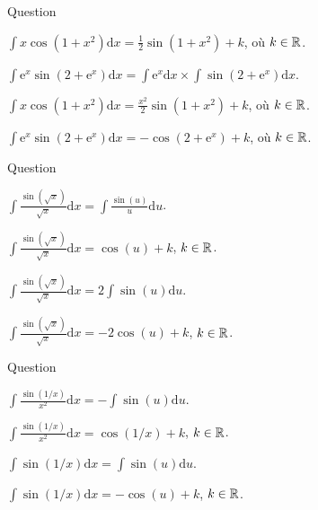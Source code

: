 \begin{multi}[multiple,feedback=
{Avec \(u=1+x^2\), on a : \(\mathrm{d}u=2x\mathrm{d}x\) et 
\[\int x\cos(1+x^2)\mathrm{d}x=\frac{1}{2}\int \cos (u)\mathrm{d}u=\frac{1}{2}\times \sin (u)+k=\frac{1}{2}\sin(1+x^2)+k,\; k\in \Rr.\]
De même, avec \(u=2+\mathrm{e}^x\), on a : \(\mathrm{d}u=\mathrm{e}^x\mathrm{d}x\) et 
\[\int \mathrm{e}^x\sin\left(2+\mathrm{e}^x\right)\mathrm{d}x=\int \sin (u)\mathrm{d}u=-\cos (u)+k=-\cos\left(2+\mathrm{e}^x\right)+k,\; k\in \Rr.\]
}]{Question}
    \item* \(\displaystyle \int x\cos(1+x^2)\mathrm{d}x=\frac{1}{2}\sin(1+x^2)+k\), où \(k\in \mathbb{R}\).
    \item \(\displaystyle \int \mathrm{e}^x\sin\left(2+\mathrm{e}^x\right)\mathrm{d}x=\int \mathrm{e}^x\mathrm{d}x\times \int\sin\left(2+\mathrm{e}^x\right)\mathrm{d}x\).
    \item \(\displaystyle \int x\cos(1+x^2)\mathrm{d}x=\frac{x^2}{2}\sin(1+x^2)+k\), où \(k\in \mathbb{R}\).
    \item* \(\displaystyle \int \mathrm{e}^x\sin\left(2+\mathrm{e}^x\right)\mathrm{d}x=-\cos\left(2+\mathrm{e}^x\right)+k\), où \(k\in \mathbb{R}\).
\end{multi}


\begin{multi}[multiple,feedback=
{Avec \(u=\sqrt{x}\), on a : \(\displaystyle \mathrm{d}u=\frac{\mathrm{d}x}{2\sqrt{x}}\). D'où
\[\int \frac{\sin (\sqrt{x})}{\sqrt{x}}\mathrm{d}x=2\int \sin (u)\mathrm{d}u=-2\cos (u)+k,\; k\in \Rr.\]
}]{Question}
    \item \(\displaystyle \int \frac{\sin (\sqrt{x})}{\sqrt{x}}\mathrm{d}x=\int \frac{\sin (u)}{u}\mathrm{d}u\).
    \item \(\displaystyle \int \frac{\sin (\sqrt{x})}{\sqrt{x}}\mathrm{d}x=\cos (u)+k\), \(k\in \mathbb{R}\).
    \item* \(\displaystyle \int \frac{\sin (\sqrt{x})}{\sqrt{x}}\mathrm{d}x=2\int \sin (u)\mathrm{d}u\).
    \item* \(\displaystyle \int \frac{\sin (\sqrt{x})}{\sqrt{x}}\mathrm{d}x=-2\cos (u)+k\), \(k\in \mathbb{R}\).
\end{multi}


\begin{multi}[multiple,feedback=
{Avec \(\displaystyle u=\frac{1}{x}\), on aura : \(\displaystyle \mathrm{d}u=\frac{-\mathrm{d}x}{x^2}\). D'où
\[\int \frac{\sin (1/x)}{x^2}\mathrm{d}x=-\int \sin (u)\mathrm{d}u=\cos (u)+k=\cos\left(1/x\right)+k,\; k\in \Rr.\]
}]{Question}
    \item* \(\displaystyle \int \frac{\sin (1/x)}{x^2}\mathrm{d}x=-\int \sin (u)\mathrm{d}u\).
    \item* \(\displaystyle \int \frac{\sin (1/x)}{x^2}\mathrm{d}x=\cos\left(1/x\right)+k\), \(k\in \mathbb{R}\).
    \item \(\displaystyle \int \sin (1/x)\mathrm{d}x=\int \sin (u)\mathrm{d}u\).
    \item \(\displaystyle \int \sin (1/x)\mathrm{d}x=-\cos (u)+k\), \(k\in \mathbb{R}\).
\end{multi}


